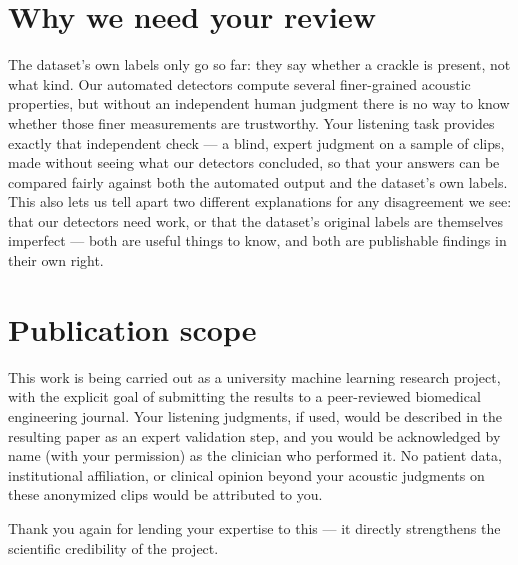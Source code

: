 \documentclass[11pt]{article}
\begin{document}
\section*{Why we need your review}
The dataset's own labels only go so far: they say whether a crackle is present, not what kind. Our
automated detectors compute several finer-grained acoustic properties, but without an independent
human judgment there is no way to know whether those finer measurements are trustworthy. Your
listening task provides exactly that independent check --- a blind, expert judgment on a sample of
clips, made without seeing what our detectors concluded, so that your answers can be compared
fairly against both the automated output and the dataset's own labels. This also lets us tell
apart two different explanations for any disagreement we see: that our detectors need work, or
that the dataset's original labels are themselves imperfect --- both are useful things to know, and
both are publishable findings in their own right.

\section*{Publication scope}
This work is being carried out as a university machine learning research project, with the
explicit goal of submitting the results to a peer-reviewed biomedical engineering journal. Your
listening judgments, if used, would be described in the resulting paper as an expert validation
step, and you would be acknowledged by name (with your permission) as the clinician who performed
it. No patient data, institutional affiliation, or clinical opinion beyond your acoustic
judgments on these anonymized clips would be attributed to you.

\vspace{6pt}
\noindent Thank you again for lending your expertise to this --- it directly strengthens the
scientific credibility of the project.
\end{document}
